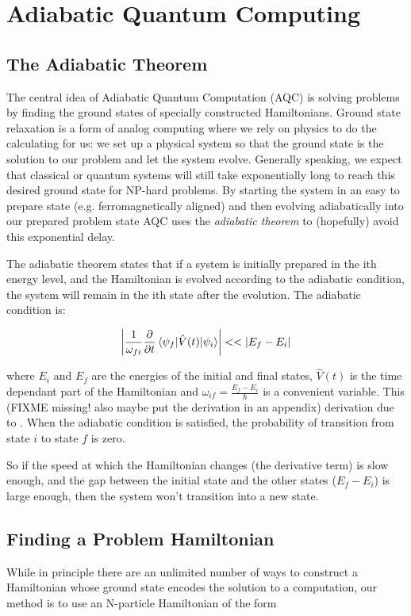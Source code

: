 \chapter{Adiabatic Quantum Computing}
\label{chap:aqc}

\section{The Adiabatic Theorem}

The central idea of Adiabatic Quantum Computation (AQC) is solving problems by finding the ground states of specially constructed Hamiltonians.  Ground state relaxation is a form of analog computing where we rely on physics to do the calculating for us: we set up a physical system so that the ground state is the solution to our problem and let the system evolve.  Generally speaking, we expect that classical or quantum systems will still take exponentially long to reach this desired ground state for NP-hard problems.\cite{aaronson}
By starting the system in an easy to prepare state (e.g. ferromagnetically aligned) and then evolving adiabatically into our prepared problem state AQC uses the \emph{adiabatic theorem} to (hopefully) avoid this exponential delay.

The adiabatic theorem states that if a system is initially prepared in the ith energy level, and the Hamiltonian is evolved according to the adiabatic condition, the system will remain in the ith state after the evolution.  The adiabatic condition is:

\begin{displaymath}
	\left | \frac{1}{\omega_{fi}}\frac{\partial}{\partial t} \mathinner{\langle{\psi_f | \hat{V}(t) | \psi_i}\rangle} \right | << |E_f - E_i|
\end{displaymath}

where $E_i$ and $E_f$ are the energies of the initial and final states, $\hat{V}(t)$ is the time dependant part of the Hamiltonian and $\omega_{if} = \frac{E_f - E_i}{\hbar}$ is a convenient variable.  This (FIXME missing! also maybe put the derivation in an appendix) derivation due to \cite{zettili}.  When the adiabatic condition is satisfied, the probability of transition from state $i$ to state $f$ is zero.

So if the speed at which the Hamiltonian changes (the derivative term) is slow enough, and the gap between the initial state and the other states ($E_f - E_i$) is large enough, then the system won't transition into a new state.  

\section{Finding a Problem Hamiltonian}
\label{sec:prob_ham}
While in principle there are an unlimited number of ways to construct a Hamiltonian whose ground state encodes the solution to a computation, our method is to use an N-particle Hamiltonian of the form

